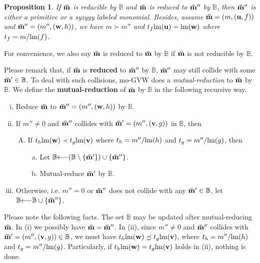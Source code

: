 \documentclass[final, number, 3p,12pt]{elsarticle}
\newtheorem{prop}[theorem]{Proposition}
\def\B{{\mathbb{B}}}
\def\brm{{\bf \bar{m}}}
\def\lm{{\rm lm}} %
\def\u{{\bf u}}
\def\v{{\bf v}}
\def\w{{\bf w}}
\def\lla{{\longleftarrow}}
\begin{document}
\begin{prop} \label{prop_reduce}
If $\brm$ is reducible by $\B$ and $\brm$ is reduced to $\brm''$ by $\B$, then $\brm''$ is either a primitive or a syzygy labeled monomial. Besides, assume $\brm = (m, (\u, f))$ and $\brm''=(m'', (\w, h))$, we have $m \succ m''$ and $t_f\lm(\u) = \lm(\w)$ where $t_f = m/\lm(f)$.
\end{prop}

For convenience, we also say $\brm$ is reduced to $\brm$ by $\B$ if $\brm$ is not reducible by $\B$. 


Please remark that, if $\brm$ is {\bf reduced} to $\brm''$ by $\B$, $\brm''$ may still collide with some $\brm' \in \B$. To deal with such collisions, mo-GVW does a {\em mutual-reduction} to $\brm$ by $\B$. We define the {\bf mutual-reduction} of $\brm$ by $\B$ in the following recursive way.


\begin{enumerate}[(i)]

\item Reduce $\brm$  to $\brm'' = (m'', (\w, h))$ by $\B$.

\item If $m''\not=0$ and $\brm''$ collides with $\brm' = (m'', (\v, g))$ in $\B$, then 

\begin{enumerate}[(A)]




\item If $t_h\lm(\w) \prec t_g\lm(\v)$ where $t_h = m''/\lm(h)$ and $t_g = m''/\lm(g)$, then 

\begin{enumerate}[(a)]


\item Let $\B \lla (\B \setminus \{\brm'\}) \cup \{\brm''\}$.

\item Mutual-reduce $\brm'$ by $\B$.

\end{enumerate}

\end{enumerate}

\item Otherwise, i.e. $m'' = 0$ or $\brm''$ does not collide with any $\brm' \in \B$,  let $\B \lla \B \cup \{\brm''\}$.

\end{enumerate}

Please note the following facts. The set $\B$ may be updated after mutual-reducing $\brm$.  In (i) we possibly have $\brm=\brm''$. In (ii), since $m''\not=0$ and $\brm''$ collides with $\brm' = (m'', (\v, g)) \in \B$, we must have $t_h\lm(\w) \preceq t_g\lm(\v)$, where $t_h = m''/\lm(h)$ and $t_g = m''/\lm(g)$. Particularly, if $t_h\lm(\w) = t_g\lm(\v)$ holds in (ii), nothing is done.
\end{document}
